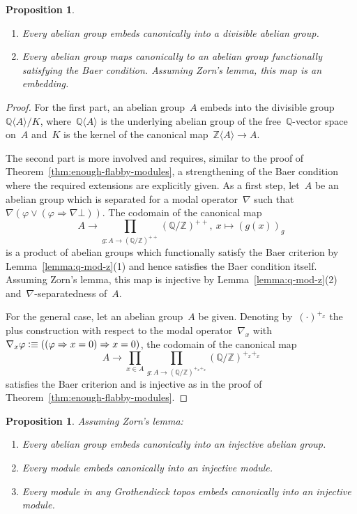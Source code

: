 \documentclass[oneside]{amsart}
\theoremstyle{definition}
\theoremstyle{plain}
\newtheorem{prop}[defn]{Proposition}
\theoremstyle{remark}
\newcommand{\ZZ}{\mathbb{Z}}
\newcommand{\QQ}{\mathbb{Q}}
\newcommand{\defeqv}{\vcentcolon\equiv}
\renewcommand{\_}{\mathpunct{.}\,}
\begin{document}
\begin{prop}\label{prop:embed2}
\begin{enumerate}
\item Every abelian group embeds canonically into a divisible abelian group.
\item Every abelian group maps canonically to an abelian group functionally satisfying the Baer
condition. Assuming Zorn's lemma, this map is an embedding.
\end{enumerate}
\end{prop}

\begin{proof}For the first part, an abelian group~$A$ embeds into the
divisible group~$\QQ\langle A \rangle / K$, where~$\QQ\langle A \rangle$ is the
underlying abelian group of the free~$\QQ$-vector space on~$A$ and~$K$ is the
kernel of the canonical map~$\ZZ\langle A \rangle \to A$.

The second part is more involved and requires, similar to the proof of
Theorem~\ref{thm:enough-flabby-modules}, a strengthening of the Baer condition
where the required extensions are explicitly given. As a first step, let~$A$ be
an abelian group which is separated for a modal operator~$\nabla$ such
that~$\nabla(\varphi \vee (\varphi \Rightarrow \nabla\bot))$. The codomain of
the canonical map
\[ A \longrightarrow \prod_{g : A \to (\QQ/\ZZ)^{++}} (\QQ/\ZZ)^{++},\
  x \longmapsto (g(x))_g \]
is a product of abelian groups which functionally satisfy the Baer criterion by
Lemma~\ref{lemma:q-mod-z}(1) and hence satisfies the Baer condition itself.
Assuming Zorn's lemma, this map is injective by Lemma~\ref{lemma:q-mod-z}(2)
and~$\nabla$-separatedness of~$A$.

For the general case, let an abelian group~$A$ be given. Denoting
by~$(\cdot)^{+_x}$ the plus construction with respect to the modal
operator~$\nabla_x$ with~$\nabla_x\varphi \defeqv ((\varphi \Rightarrow x
= 0) \Rightarrow x = 0)$, the codomain of the canonical map
\[ A \longrightarrow \prod_{x \in A} \prod_{g : A \to (\QQ/\ZZ)^{+_x+_x}}
(\QQ/\ZZ)^{+_x+_x} \]
satisfies the Baer criterion and is injective as in the proof of
Theorem~\ref{thm:enough-flabby-modules}.
\end{proof}

\begin{prop}Assuming Zorn's lemma:
\begin{enumerate}
\item Every abelian group embeds canonically into an injective abelian group.
\item Every module embeds canonically into an injective module.
\item Every module in any Grothendieck topos embeds canonically into an injective module.
\end{enumerate}
\end{prop}
\end{document}
